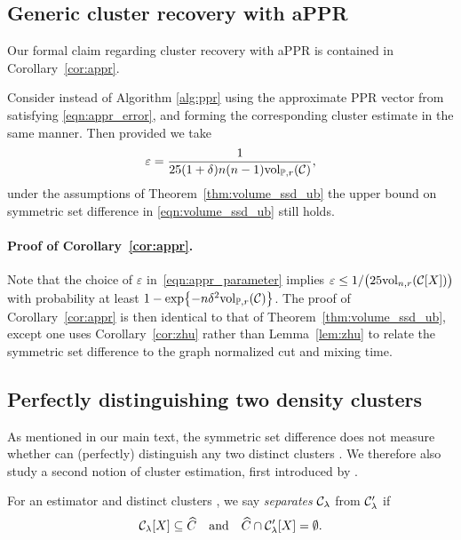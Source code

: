 \subsection{Generic cluster recovery with aPPR}
\label{subsec:appr_volume_ssd_ub}
Our formal claim regarding cluster recovery with aPPR is contained in Corollary~\ref{cor:appr}.
\begin{corollary}
	\label{cor:appr}
	Consider instead of
	Algorithm \ref{alg:ppr} using the approximate PPR vector from
	\citet{andersen2006} satisfying \eqref{eqn:appr_error}, and forming the 
	corresponding cluster estimate  in the same manner.  Then 
	provided we take 
	\begin{equation}
	\label{eqn:appr_parameter}
	\varepsilon = \frac{1}{25(1 + \delta)n(n - 1)\mathrm{vol}_{\mathbb{P},r}(\mathcal{C})} ,
	\end{equation}
	under the assumptions of Theorem~\ref{thm:volume_ssd_ub} the upper bound on symmetric set difference in \eqref{eqn:volume_ssd_ub} still
	holds.
\end{corollary}	
\paragraph{Proof of Corollary~\ref{cor:appr}.}
	Note that the choice of $\varepsilon$ in~\eqref{eqn:appr_parameter} implies $\varepsilon \leq 1/\bigl(25\mathrm{vol}_{n,r}(\mathcal{C}[X])\bigr)$ with probability at least $1 - \exp\bigl\{-n\delta^2\mathrm{vol}_{\mathbb{P},r}(\mathcal{C})\bigr\}$. The proof of Corollary~\ref{cor:appr} is then identical to that of Theorem~\ref{thm:volume_ssd_ub}, except one uses Corollary~\ref{cor:zhu} rather than Lemma~\ref{lem:zhu} to relate the symmetric set difference to the graph normalized cut and mixing time.

\subsection{Perfectly distinguishing two density clusters}
\label{subsec:consistent_recovery_density_clusters}

As mentioned in our main text, the symmetric set difference does not measure whether 
can (perfectly) distinguish any two distinct clusters . We therefore also study a second notion of cluster 
estimation, first introduced by \citet{hartigan1981}.

\begin{definition}
	\label{def:density_cluster_consistency}
	For an estimator  and distinct clusters , we say  \emph{separates} $\mathcal{C}_{\lambda}$ from $\mathcal{C}_{\lambda}'$ if 
	\begin{equation}
	\label{eqn:density_cluster_consistency}
	\mathcal{C}_{\lambda}[X] \subseteq \widehat{C} \quad \text{and} \quad
	\widehat{C} \cap \mathcal{C}_{\lambda}'[X] = \emptyset.
	\end{equation}
\end{definition}

